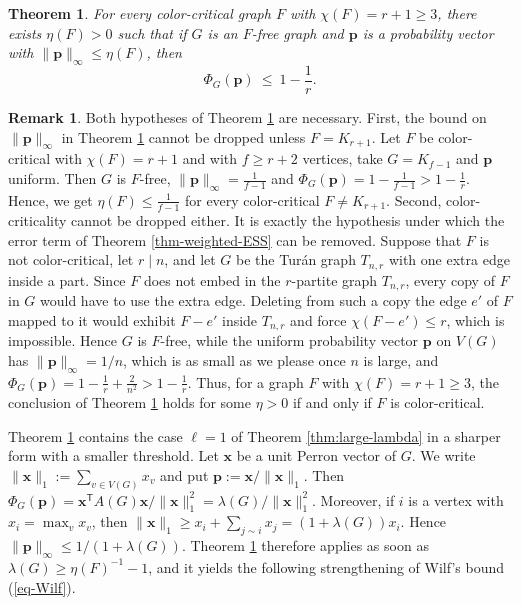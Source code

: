 \documentclass[11pt, a4paper]{article}
\newtheorem{theorem}{Theorem}[section]
\theoremstyle{definition}
\newtheorem{remark}{Remark}
\theoremstyle{plain}
\renewcommand{\le}{\leqslant}
\renewcommand{\ge}{\geqslant}
\newcommand{\pmax}{\lVert \bm{p} \rVert_{\infty}}
\begin{document}
\begin{theorem}
\label{thm-second-key}
For every color-critical graph $F$ with $\chi (F)=r+1\ge 3$, there exists
$\eta (F)>0$ such that if $G$ is an $F$-free graph and $\bm{p}$ is a
probability vector with $\lVert \bm{p}\rVert_\infty \le \eta (F)$, then
\[ \Phi_G(\bm{p}) \ \le\  1-\frac{1}{r}. \] 
\end{theorem}


\begin{remark} \label{rem:necessity}
Both hypotheses of Theorem \ref{thm-second-key} are necessary.  
First, the bound on $\pmax$ in Theorem \ref{thm-second-key} cannot be dropped unless $F=K_{r+1}$. 
Let $F$ be color-critical with $\chi (F)=r+1$ and with $f\ge r+2$ vertices, take $G=K_{f-1}$ and $\bm{p}$ uniform. Then $G$ is $F$-free, $\pmax = \frac{1}{f-1}$ and
$ \Phi_G(\bm{p})=1-\frac{1}{f-1}>1-\frac1r $.
Hence, we get $\eta (F)\le \frac{1}{f-1}$ for every
color-critical $F\neq K_{r+1}$.  
Second, color-criticality cannot be dropped either. It is exactly the hypothesis under which the error term of Theorem \ref{thm-weighted-ESS} can be removed. Suppose that $F$ is not color-critical, let $r\mid n$, and let $G$ be
the Tur\'an graph $T_{n,r}$ with one extra edge inside a part. 
Since $F$ does
not embed in the $r$-partite graph $T_{n,r}$, every copy of $F$ in $G$ would
have to use the extra edge. Deleting from such a copy the edge $e'$ of $F$
mapped to it would exhibit $F-e'$ inside $T_{n,r}$ and force
$\chi (F-e')\le r$, which is impossible. Hence $G$ is $F$-free, while the
uniform probability vector $\bm{p}$ on $V(G)$ has
$\lVert \bm{p}\rVert_\infty =1/n$, which is as small as we please once $n$ is large, and
$\Phi_G(\bm{p})=1-\frac1r+\frac{2}{n^{2}}>1-\frac1r$. Thus, for a graph $F$
with $\chi (F)=r+1\ge 3$, the conclusion of Theorem \ref{thm-second-key} holds
for some $\eta >0$ if and only if $F$ is color-critical.
\end{remark}


Theorem \ref{thm-second-key} contains the case
$\ell =1$ of Theorem \ref{thm:large-lambda} in a
sharper form with a smaller threshold. 
Let $\bm{x}$ be a unit Perron vector of $G$. 
 We write $\lVert \bm{x}\rVert_1:=\sum_{v\in V(G)}x_v$ and put
$\bm{p}:=\bm{x}/\lVert \bm{x}\rVert_1$. 
 Then $\Phi_G(\bm{p})=\bm{x}^{\mathsf T}A(G)\bm{x}
 / \lVert \bm{x}\rVert_1^{2}
 =\lambda (G)/\lVert \bm{x}\rVert_1^{2}$. Moreover, if $i$ is a vertex with $x_i=\max_v x_v$, then 
$\lVert \bm{x}\rVert_1\ge x_i+\sum_{j\sim i}x_j
 =(1+\lambda (G))x_i$. Hence  
$\lVert \bm{p}\rVert_\infty \le 1/(1+\lambda (G))$.
Theorem \ref{thm-second-key} therefore applies as soon as $\lambda (G)\ge \eta (F)^{-1}-1$, and 
it yields the following strengthening of Wilf's bound (\ref{eq-Wilf}).
\end{document}
